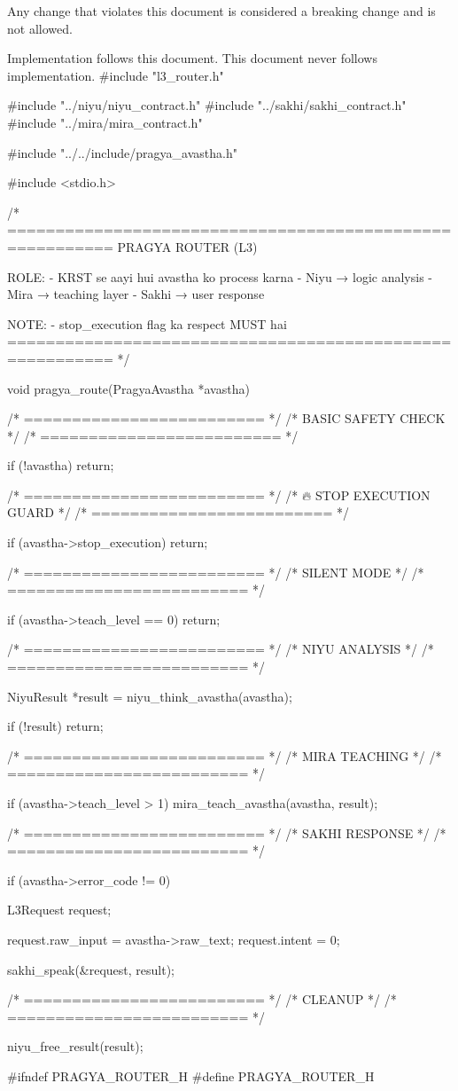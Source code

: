 \documentclass{article}
\begin{document}
Any change that violates this document
is considered a breaking change and is not allowed.

Implementation follows this document.
This document never follows implementation.
#include "l3_router.h"

#include "../niyu/niyu_contract.h"
#include "../sakhi/sakhi_contract.h"
#include "../mira/mira_contract.h"

#include "../../include/pragya_avastha.h"

#include <stdio.h>

/*
=========================================================
   PRAGYA ROUTER (L3)

   ROLE:
   - KRST se aayi hui avastha ko process karna
   - Niyu → logic analysis
   - Mira → teaching layer
   - Sakhi → user response

   NOTE:
   - stop_execution flag ka respect MUST hai
=========================================================
*/

void pragya_route(PragyaAvastha *avastha)
{
    /* ========================= */
    /* BASIC SAFETY CHECK        */
    /* ========================= */

    if (!avastha)
        return;

    /* ========================= */
    /* 🔥 STOP EXECUTION GUARD   */
    /* ========================= */

    if (avastha->stop_execution)
        return;

    /* ========================= */
    /* SILENT MODE               */
    /* ========================= */

    if (avastha->teach_level == 0)
        return;

    /* ========================= */
    /* NIYU ANALYSIS             */
    /* ========================= */

    NiyuResult *result = niyu_think_avastha(avastha);

    if (!result)
        return;

    /* ========================= */
    /* MIRA TEACHING             */
    /* ========================= */

    if (avastha->teach_level > 1)
    {
        mira_teach_avastha(avastha, result);
    }

    /* ========================= */
    /* SAKHI RESPONSE            */
    /* ========================= */

    if (avastha->error_code != 0)
    {
        L3Request request;

        request.raw_input = avastha->raw_text;
        request.intent = 0;

        sakhi_speak(&request, result);
    }

    /* ========================= */
    /* CLEANUP                   */
    /* ========================= */

    niyu_free_result(result);
}
#ifndef PRAGYA_ROUTER_H
#define PRAGYA_ROUTER_H
\end{document}
